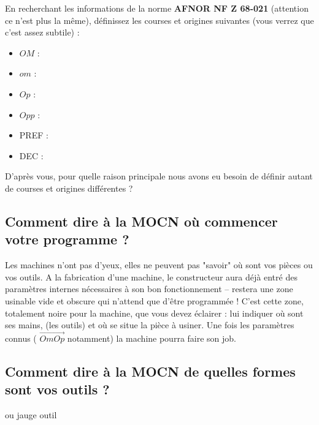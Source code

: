 \documentclass[12pt]{article}
\newcounter{exo}
\newenvironment{exo}{\stepcounter{exo}\vspace{0.5cm}{\bfseries Question \theexo\ :}}{\par\vspace{0.5cm}}
\begin{document}
\begin{exo}\label{exo1} En recherchant les informations de la norme \textbf{AFNOR NF Z 68-021} (attention ce n'est plus la même), définissez les courses et origines suivantes (vous verrez que c'est assez subtile) :\end{exo}
\begin{itemize}
    \item $OM$ :
    \item $om$ :
    \item $Op$ :
    \item $Opp$ :
    \item PREF :
    \item DEC :
\end{itemize}


\begin{exo}\label{exo1} D'après vous, pour quelle raison principale nous avons eu besoin de définir autant de courses et origines différentes ? \end{exo}




\subsection{Comment dire à la MOCN où commencer votre programme ?}

\begin{tcolorbox}[colback=blue!5!white,colframe=red!75!black]
  \bcinfo Les machines n'ont pas d'yeux, elles ne peuvent pas "savoir" où sont vos pièces ou vos outils. A la fabrication d'une machine, le constructeur aura déjà entré des paramètres internes nécessaires à son bon fonctionnement -- restera une zone usinable vide et obscure qui n'attend que d'être programmée ! C'est cette zone, totalement noire pour la machine, que vous devez éclairer : lui indiquer où sont ses mains, (les outils) et où se situe la pièce à usiner. Une fois les paramètres connus ( $\overrightarrow{OmOp}$ notamment) la machine pourra faire son job. 
\end{tcolorbox}


\subsection{Comment dire à la MOCN de quelles formes sont vos outils ?}
ou jauge outil
\end{document}
